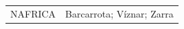 \documentclass[journal abbreviation, manuscript]{copernicus}
\begin{document}
\begin{table}
\begin{tabularx}{\textwidth}{lX}
  NAFRICA  & Barcarrota; Víznar; Zarra                                                                                                                                                                                                                                                                                                                                                                                                                                                                                                                                                                                                                                                                                                                                                                                                                                                                                                                                                                                                                                                                                                                                                                                                                                                                                                                                                                                                                                                                                                                                                                                                                                                                                                                                                                                                                                                                                                                                                                                                                                                                                                                                                                                                                                                                                                                                                                                                                                                                                                                                                                                                                                                                                                                                                                                                                                                                                                                                                                                                                                                                                                                                                                                                                                                                                                                                                                                   
\end{tabularx}
\end{table}
\end{document}
